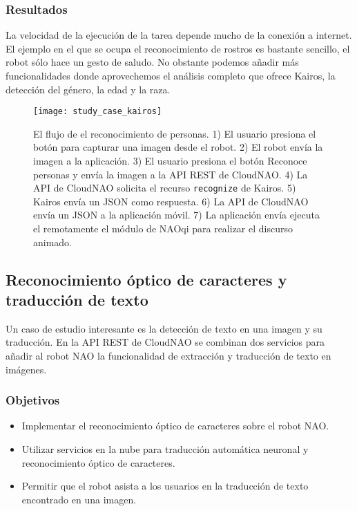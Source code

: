 \subsubsection{Resultados}

La velocidad de la ejecución de la tarea
depende mucho de la conexión a internet.
El ejemplo en el que se ocupa el reconocimiento
de rostros es bastante sencillo, el robot
sólo hace un gesto de saludo. No obstante 
podemos añadir más funcionalidades donde
aprovechemos el análisis completo que ofrece
Kairos, la detección del género, la edad y la raza.



\begin{figure}[htbp]
\centering
\texttt{[image: study\_case\_kairos]}
\caption{El flujo de el reconocimiento de personas. 1) El usuario presiona el botón para capturar una imagen desde el robot. 2) El robot envía la imagen a la 
aplicación. 3) El usuario presiona el botón Reconoce personas y envía la imagen a la API REST de CloudNAO. 4) La API de CloudNAO solicita el recurso \texttt{recognize} de Kairos. 5) Kairos envía un JSON como respuesta. 6) La API 
de CloudNAO envía un JSON a la aplicación móvil. 7) La aplicación envía ejecuta el remotamente el módulo de NAOqi para realizar el discurso animado.}
\end{figure}



\subsection{Reconocimiento óptico de caracteres y traducción de texto}

Un caso de estudio interesante es la
detección de texto en una imagen y su
traducción.
En la API REST de CloudNAO se combinan dos servicios
para añadir al robot NAO la funcionalidad de extracción y traducción de texto en imágenes. 


\subsubsection{Objetivos}

\begin{itemize}
    \item Implementar el reconocimiento óptico
    de caracteres sobre el robot NAO.
    \item Utilizar servicios en la nube para traducción
    automática neuronal y reconocimiento óptico de caracteres.
    \item Permitir que el robot asista a los usuarios
    en la traducción de texto encontrado en una imagen.
\end{itemize}

